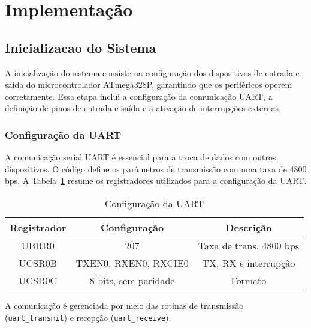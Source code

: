 \documentclass{sbrt}
\begin{document}
\section{Implementação}

\subsection{Inicializacao do Sistema}

A inicialização do sistema consiste na configuração dos dispositivos de entrada e saída do microcontrolador ATmega328P, garantindo que os periféricos operem corretamente. Essa etapa inclui a configuração da comunicação UART, a definição de pinos de entrada e saída e a ativação de interrupções externas.

\subsubsection{Configuração da UART}
A comunicação serial UART é essencial para a troca de dados com outros dispositivos. O código define os parâmetros de transmissão com uma taxa de 4800 bps. A Tabela~\ref{tab:uart} resume os registradores utilizados para a configuração da UART.

\begin{table}[h]
\centering
\caption{Configuração da UART}
\label{tab:uart}
\begin{tabular}{|c|c|c|}
\hline
Registrador & Configuração & Descrição \\
\hline
UBRR0 & 207 & Taxa de trans. 4800 bps \\
UCSR0B & TXEN0, RXEN0, RXCIE0 & TX, RX e interrupção \\
UCSR0C & 8 bits, sem paridade & Formato \\
\hline
\end{tabular}
\end{table}

A comunicação é gerenciada por meio das rotinas de transmissão (\texttt{uart\_transmit}) e recepção (\texttt{uart\_receive}).
\end{document}
